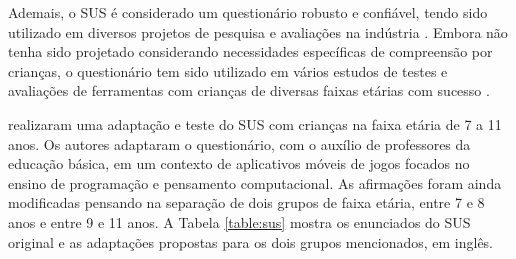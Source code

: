 Ademais, o SUS é considerado um questionário robusto e confiável, tendo sido utilizado em diversos projetos de pesquisa e avaliações na indústria \citep{brooke1996sus}. Embora não tenha sido projetado considerando necessidades específicas de compreensão por crianças, o questionário tem sido utilizado em vários estudos de testes e avaliações de ferramentas com crianças de diversas faixas etárias com sucesso \citep[i.e.][]{wronska2015ipad, dexheimer2017usability, sanchez2020usability, tasfia2023evaluating}. 

\citet{putnam2020adaptation} realizaram uma adaptação e teste do SUS com crianças na faixa etária de 7 a 11 anos. Os autores adaptaram o questionário, com o auxílio de professores da educação básica, em um contexto de aplicativos móveis de jogos focados no ensino de programação e pensamento computacional. As afirmações foram ainda modificadas pensando na separação de dois grupos de faixa etária, entre 7 e 8 anos e entre 9 e 11 anos. A Tabela \ref{table:sus} mostra os enunciados do SUS original e as adaptações propostas para os dois grupos mencionados, em inglês.

